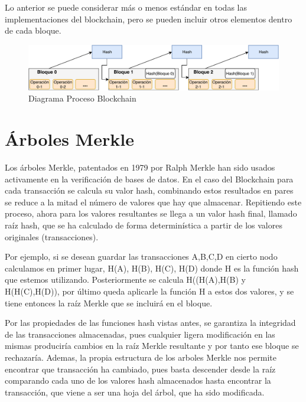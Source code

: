 Lo anterior se puede considerar más o menos estándar en todas las implementaciones del blockchain, pero se pueden incluir otros elementos dentro de cada bloque.
\begin{figure}[H]
  \begin{center}
  \includegraphics[width=14cm]{figures/Blockchain_diagram.pdf}
  \end{center}
  \caption{Diagrama Proceso Blockchain}%

	\label{fig:blockchain}%
\end{figure}

\section{Árboles Merkle}\label{merkle}
Los árboles Merkle, patentados en 1979 por Ralph Merkle\citep{merkle1987digital} han sido usados activamente en la verificación de bases de datos.
En el caso del Blockchain para cada transacción se calcula su valor hash, combinando estos resultados en pares se reduce a la mitad el número de valores que hay que almacenar. Repitiendo este proceso, ahora para los valores resultantes se llega a un valor hash final, llamado raíz hash, que se ha calculado de forma determinística a partir de los valores originales (transacciones).

Por ejemplo, si se desean guardar las transacciones A,B,C,D en cierto nodo calculamos en primer lugar, H(A), H(B), H(C), H(D) donde H es la función hash que estemos utilizando. Posteriormente se calcula H((H(A),H(B) y H(H(C),H(D)), por último queda aplicarle la función H a estos dos valores, y se tiene entonces la raíz Merkle que se incluirá en el bloque.

Por las propiedades de las funciones hash vistas antes, se garantiza la integridad de las transacciones almacenadas, pues cualquier ligera modificación en las mismas produciría cambios en la raíz Merkle resultante y por tanto ese bloque se rechazaría. Ademas, la propia estructura de los arboles Merkle nos permite encontrar que transacción ha cambiado, pues basta descender desde la raíz comparando cada uno de los valores hash almacenados hasta encontrar la transacción, que viene a ser una hoja del árbol, que ha sido modificada.

